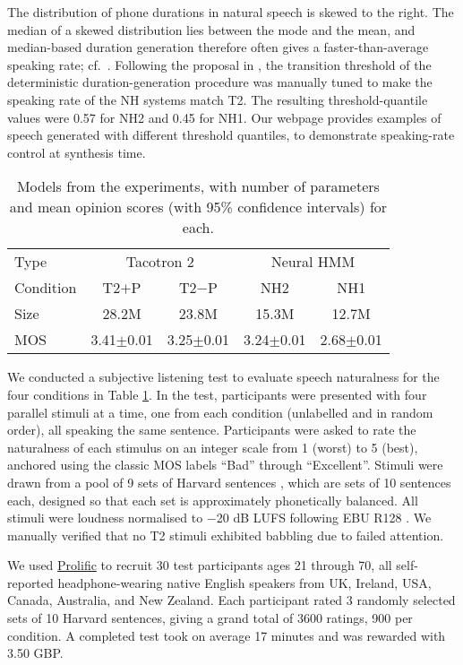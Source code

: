 \documentclass[british]{article}
\newcommand{\tc}{T2}
\newcommand{\tcp}{T2$+$P}
\newcommand{\tcnop}{T2$-$P}
\newcommand{\nh}{NH}
\newcommand{\nhtwo}{NH2}
\newcommand{\nhone}{NH1}
\begin{document}
The distribution of phone durations in natural speech is skewed to the right.
The median of a skewed distribution lies between the mode and the mean, and median-based duration generation therefore often gives a faster-than-average speaking rate; cf.\ \cite{henter2016robust}.
Following the proposal in \cite{henter2017nonparametric}, the transition threshold of the deterministic duration-generation procedure was manually tuned to make the speaking rate of the \nh{} systems match \tc{}.
The resulting threshold-quantile values were 0.57 for \nhtwo{} and 0.45 for \nhone{}.
Our webpage provides examples of speech generated with different threshold quantiles, to demonstrate speaking-rate control at synthesis time.
\begin{table}[!t]
\centering
\begin{tabular}{@{}lcccc@{}}
\toprule 
Type & \multicolumn{2}{c}{Tacotron 2} & \multicolumn{2}{c}{Neural HMM}\\
Condition & \tcp{} & \tcnop{} & \nhtwo{} & \nhone{}\\
\midrule 
Size & 28.2M & 23.8M & 15.3M & 12.7M\\
MOS & 3.41$\pm$0.01 & 3.25$\pm$0.01 & 3.24$\pm$0.01 & 2.68$\pm$0.01\\
\bottomrule
\end{tabular}\caption{Models from the experiments, with number of parameters and mean opinion scores (with 95\% confidence intervals) for each.}
\label{tab:results}
\vspace{-0.8\baselineskip}
\end{table}



We conducted a subjective listening test to evaluate speech naturalness for the four conditions in Table \ref{tab:results}.
In the test, participants were presented with four parallel stimuli at a time, one from each condition (unlabelled and in random order), all speaking the same sentence.
Participants were asked to rate the naturalness of each stimulus on an integer scale from 1 (worst) to 5 (best), anchored using the classic MOS labels ``Bad'' through ``Excellent''.
Stimuli were drawn from a pool of 9 sets of Harvard sentences \cite{rothauser1969ieee}, which are sets of 10 sentences each, designed so that each set is approximately phonetically balanced.
All stimuli were loudness normalised to $-$20 dB LUFS following EBU R128 \cite{ebu2020loudness}.
We manually verified that no \tc{} stimuli exhibited babbling due to failed attention.

We used \href{https://prolific.co/}{Prolific} to recruit 30 test participants ages 21 through 70, all self-reported headphone-wearing native English speakers from UK, Ireland, USA, Canada, Australia, and New Zealand.
Each participant rated 3 randomly selected sets of 10 Harvard sentences, giving a grand total of 3600 ratings, 900 per condition.
A completed test took on average 17 minutes and was rewarded with 3.50 GBP.
\end{document}
